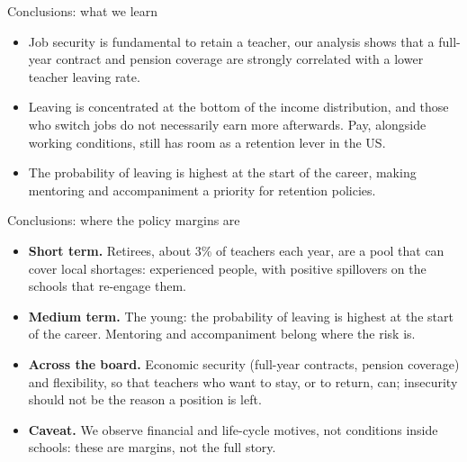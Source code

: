 \documentclass[aspectratio=169,11pt]{beamer}
\newcommand{\appbtn}[2]{\hyperlink{#1<1>}{\beamergotobutton{#2}}}
\begin{document}
\begin{frame}[label=mainconcl]{Conclusions: what we learn}
  \vspace{0.5em}
  \begin{itemize}\setlength\itemsep{1.1em}
    \item Job security is fundamental to retain a teacher, our analysis
          shows that a full-year contract and pension coverage are
          strongly correlated with a lower teacher leaving rate.
    \item Leaving is concentrated at the bottom of the income
          distribution, and those who switch jobs do not necessarily
          earn more afterwards. Pay, alongside working conditions,
          still has room as a retention lever in the US.
    \item The probability of leaving is highest at the start of the
          career, making mentoring and accompaniment a priority for
          retention policies.
  \end{itemize}
  \vfill
  \appbtn{appswitchpay}{do switchers earn more?}
\end{frame}

\begin{frame}{Conclusions: where the policy margins are}
  \vspace{0.4em}
  \begin{itemize}\setlength\itemsep{0.9em}
    \item {\color{navy}\bfseries Short term.} Retirees, about 3\% of
          teachers each year, are a pool that can cover local shortages:
          experienced people, with positive spillovers on the schools
          that re-engage them.
    \item {\color{navy}\bfseries Medium term.} The young: the
          probability of leaving is highest at the start of the career.
          Mentoring and accompaniment belong where the risk is.
    \item {\color{navy}\bfseries Across the board.} Economic security
          (full-year contracts, pension coverage) and flexibility, so
          that teachers who want to stay, or to return, can; insecurity
          should not be the reason a position is left.
    \item {\color{navy}\bfseries Caveat.} We observe financial and
          life-cycle motives, not conditions inside schools: these are
          margins, not the full story.
  \end{itemize}
\end{frame}
\end{document}
